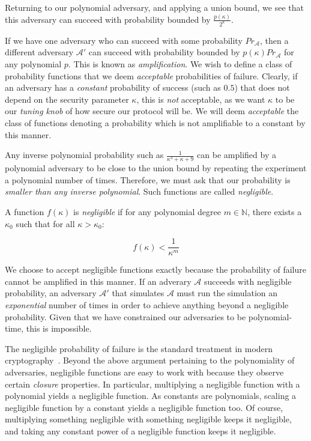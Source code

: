 Returning to our polynomial adversary, and applying a union bound, we see that
this adversary can succeed with probability bounded by $\frac{p(\kappa)}{2^\kappa}$.

If we have one adversary who can succeed with some probability $Pr_\mathcal{A}$,
then a different adversary $\mathcal{A}'$ can succeed with probability
bounded by $p(\kappa) Pr_{\mathcal{A}}$ for any polynomial $p$. This is known as
\emph{amplification}.
We wish to define a class of probability functions that we deem \emph{acceptable}
probabilities of failure. Clearly, if an adversary has a \emph{constant} probability of success
(such as $0.5$) that does not depend on the security parameter $\kappa$, this is \emph{not}
acceptable, as we want $\kappa$ to be our \emph{tuning knob} of how secure our protocol will be.
We will deem \emph{acceptable} the class of functions denoting a probability which is not
amplifiable to a constant by this manner.

Any inverse polynomial probability such as $\frac{1}{\kappa^3 + \kappa + 9}$ can be amplified by a
polynomial adversary to be close to the union bound by repeating the experiment a polynomial
number of times. Therefore, we must ask that our probability is \emph{smaller than any inverse
polynomial}. Such functions are called \emph{negligible}.

\begin{definition}
  A function $f(\kappa)$ is \emph{negligible} if for any polynomial degree
  $m \in \mathbb{N}$, there exists a $\kappa_0$ such that for all
  $\kappa > \kappa_0$:

  \[
    f(\kappa) < \frac{1}{\kappa^m}
  \]
\end{definition}

We choose to accept negligible functions exactly because the probability of failure
cannot be amplified in this manner. If an adverary $\mathcal{A}$ succeeds with negligible
probability, an adversary $\mathcal{A}'$ that simulates $\mathcal{A}$ must run the
simulation an \emph{exponential} number of times in order to achieve anything beyond
a negligible probability. Given that we have constrained our adversaries to be polynomial-time,
this is impossible.

The negligible probability of failure is the standard treatment in modern cryptography~\cite{katz}.
Beyond the above argument pertaining to the polynomiality of adversaries, negligible
functions are easy to work with because they observe certain \emph{closure} properties.
In particular, multiplying a negligible function with a polynomial yields a negligible
function. As constants are polynomials, scaling a negligible function by a constant
yields a negligible function too. Of course, multiplying something negligible with
something negligible keeps it negligible, and taking any constant power of a negligible function
keeps it negligible.


